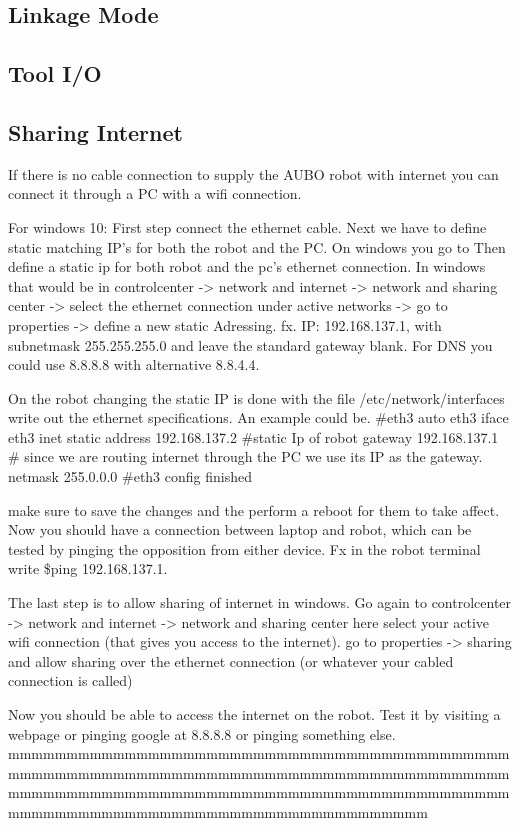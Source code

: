 \documentclass{article}
\begin{document}
\subsection{Linkage Mode}
\subsection{Tool I/O}
\subsection{Sharing Internet}
If there is no cable connection to supply the AUBO robot with internet you can connect it through a PC with a wifi connection. 

For windows 10: 
First step connect the ethernet cable.
Next we have to define static matching IP's for both the robot and the PC. 
On windows you go to 
Then define a static ip for both robot and the pc's ethernet connection. 
In windows that would be in controlcenter -> network and internet -> network and sharing center -> select the ethernet connection under active networks -> go to properties -> define a new static Adressing. fx. IP: 192.168.137.1, with subnetmask 255.255.255.0 and leave the standard gateway blank. For DNS you could use 8.8.8.8 with alternative 8.8.4.4. 

On the robot changing the static IP is done with the file /etc/network/interfaces
write out the ethernet specifications. An example could be. 
#eth3
auto eth3 
iface eth3 inet static 
address 192.168.137.2 #static Ip of robot
gateway 192.168.137.1 # since we are routing internet through the PC we use its IP as the gateway. 
netmask 255.0.0.0  
#eth3 config finished

make sure to save the changes and the perform a reboot for them to take affect. 
Now you should have a connection between laptop and robot, which can be tested by pinging the opposition from either device. Fx in the robot terminal write \$ping 192.168.137.1.
 
The last step is to allow sharing of internet in windows. Go again to controlcenter -> network and internet -> network and sharing center here select your active wifi connection (that gives you access to the internet). go to properties -> sharing and allow sharing over the ethernet connection (or whatever your cabled connection is called)

Now you should be able to access the internet on the robot. Test it by visiting a webpage or pinging google at 8.8.8.8 or pinging something else.  mmmmmmmmmmmmmmmmmmmmmmmmmmmmmmmmmmmmmmmmmmmmmmmmmmmmmmmmmmmmmmmmmmmmmmmmmmmmmmmmmmmmmmmmmmmmmmmmmmmmmmmmmmmmmmmmmmmmmmmmmmmmmmmmmmmmmmmmmmmmmmmmmmmmmmmmmmmmmmmmmmmmm 
\end{document}
